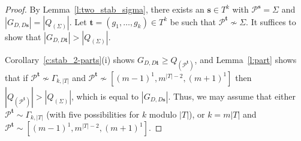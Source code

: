 \documentclass[twoside,a4paper,reqno,11pt]{amsart}
\newcommand{\<}{\langle}
\renewcommand{\>}{\rangle}
\newcommand{\geqs}{\geqslant}
\newcommand{\minPart}{\Gamma_{k, |T|}}
\theoremstyle{definition}
\begin{document}
\begin{proof}
	By Lemma~\ref{l:two_stab_sigma},  there exists an $\mathbf{s}\in T^k$ with $\mathcal{P}^{\mathbf{s}} = \Sigma$ and $|G_{D,D\mathbf{s}}|  =  |Q_{(\Sigma)}|$. Let $\mathbf{t} = (g_1,\dots,g_k) \in T^k$ be such that $\mathcal{P}^{\mathbf{t}} \not \sim\Sigma$. It suffices to  show that $|G_{D,D\mathbf{t}}| > |Q_{(\Sigma)}|$.

    Corollary~\ref{c:stab_2-parts}(i) shows $G_{D,D\mathbf{t}} \geqs Q_{(\mathcal{P}^{\mathbf{t}})}$, and Lemma~\ref{l:part}  shows that if $\mathcal{P}^{\mathbf{t}}\not \sim \minPart$ and $\mathcal{P}^{\mathbf{t}} \not \sim [(m-1)^1, m^{|T|-2}, (m+1)^{1}]$ then 
	$|Q_{(\mathcal{P}^{\mathbf{t}})}| > |Q_{(\Sigma)}|$, which is equal to $|G_{D,D\mathbf{s}}|$.
	Thus, we may assume that either $\mathcal{P}^{\mathbf{t}}\sim \minPart$ (with five possibilities for $k$ modulo $|T|$), or $k = m|T|$ and $\mathcal{P}^{\mathbf{t}} \sim [(m-1)^1, m^{|T|-2}, (m+1)^{1}]$.
	

\end{proof}
\end{document}
